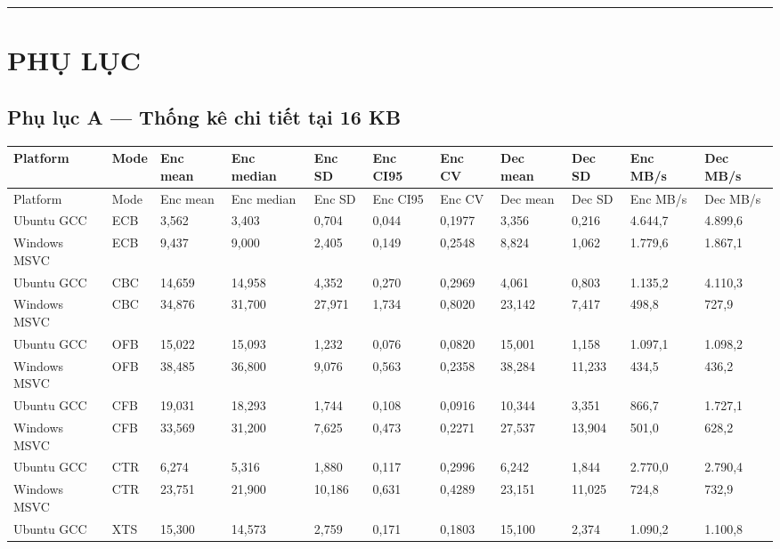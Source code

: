 \documentclass[12pt,a4paper,oneside]{report}
\begin{document}
\par\noindent\rule{\textwidth}{0.4pt}


\chapter{PHỤ LỤC}


\section{Phụ lục A — Thống kê chi tiết tại 16 KB}


\begin{longtable}{p{}p{}p{}p{}p{}p{}p{}p{}p{}p{}p{}}
\toprule
Platform & Mode & Enc mean & Enc median & Enc SD & Enc CI95 & Enc CV & Dec mean & Dec SD & Enc MB/s & Dec MB/s \\
\midrule
\endfirsthead
\toprule
Platform & Mode & Enc mean & Enc median & Enc SD & Enc CI95 & Enc CV & Dec mean & Dec SD & Enc MB/s & Dec MB/s \\
\midrule
\endhead
Ubuntu GCC & ECB & 3,562 & 3,403 & 0,704 & 0,044 & 0,1977 & 3,356 & 0,216 & 4.644,7 & 4.899,6 \\
Windows MSVC & ECB & 9,437 & 9,000 & 2,405 & 0,149 & 0,2548 & 8,824 & 1,062 & 1.779,6 & 1.867,1 \\
Ubuntu GCC & CBC & 14,659 & 14,958 & 4,352 & 0,270 & 0,2969 & 4,061 & 0,803 & 1.135,2 & 4.110,3 \\
Windows MSVC & CBC & 34,876 & 31,700 & 27,971 & 1,734 & 0,8020 & 23,142 & 7,417 & 498,8 & 727,9 \\
Ubuntu GCC & OFB & 15,022 & 15,093 & 1,232 & 0,076 & 0,0820 & 15,001 & 1,158 & 1.097,1 & 1.098,2 \\
Windows MSVC & OFB & 38,485 & 36,800 & 9,076 & 0,563 & 0,2358 & 38,284 & 11,233 & 434,5 & 436,2 \\
Ubuntu GCC & CFB & 19,031 & 18,293 & 1,744 & 0,108 & 0,0916 & 10,344 & 3,351 & 866,7 & 1.727,1 \\
Windows MSVC & CFB & 33,569 & 31,200 & 7,625 & 0,473 & 0,2271 & 27,537 & 13,904 & 501,0 & 628,2 \\
Ubuntu GCC & CTR & 6,274 & 5,316 & 1,880 & 0,117 & 0,2996 & 6,242 & 1,844 & 2.770,0 & 2.790,4 \\
Windows MSVC & CTR & 23,751 & 21,900 & 10,186 & 0,631 & 0,4289 & 23,151 & 11,025 & 724,8 & 732,9 \\
Ubuntu GCC & XTS & 15,300 & 14,573 & 2,759 & 0,171 & 0,1803 & 15,100 & 2,374 & 1.090,2 & 1.100,8 \\

\end{longtable}
\end{document}
